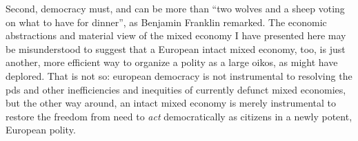 Second, democracy must, and can be more than ``two wolves and a sheep voting on what to have for dinner'', as Benjamin Franklin remarked.
The economic abstractions and material view of the mixed economy I have presented here may be misunderstood to suggest that a European intact mixed economy, too, is just another, more efficient way to organize a polity as a large oikos, as \citeauthor{Arendt1958} might have deplored.
That is not so:
european democracy is not instrumental to resolving the \glspl{pd} and other inefficiencies and inequities of currently defunct mixed economies, but the other way around, an intact mixed economy is merely instrumental to restore the freedom from need to \emph{act} democratically as citizens in a newly potent, European polity.






